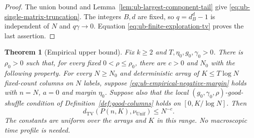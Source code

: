 \documentclass[11pt]{article}
\numberwithin{equation}{section}
\newtheorem{theorem}{Theorem}[section]
\newcommand{\TV}{\mathrm{TV}}
\newcommand{\Unif}{\mathrm{Unif}}
\newcommand{\1}{\mathbf 1}
\newcommand{\dTV}{d_{\TV}}
\newcommand{\nuUnif}{\nu_{\Unif}}
\begin{document}
\begin{proof}
The union bound and Lemma~\ref{lem:ub-largest-component-tail} give
\eqref{eq:ub-single-matrix-truncation}. The integers $B,d$ are fixed,
so $q=d_B^d-1$ is independent of $N$ and $q\gamma\to0$.
Equation \eqref{eq:ub-finite-exploration-tv} proves the last assertion.
\end{proof}

\begin{theorem}[Empirical upper bound]
\label{thm:ub-empirical-upper}
Fix $k\ge2$ and $T,\eta_0,g_0,\gamma_0>0$.
There is $\rho_0>0$ such that, for every fixed $0<\rho\le\rho_0$,
there are $c>0$ and $N_0$ with the following property.
For every $N\ge N_0$ and deterministic array of $K\le T\log N$
fixed-count columns on $N$ labels, suppose
\eqref{eq:ub-empirical-negative-margin} holds with $n=N$, $a=0$
and margin $\eta_0$. Suppose also that the local
$(g_0,\gamma_0,\rho)$-good-shuffle condition of
Definition~\ref{def:good-columns} holds on $[0,K/\log N]$.
Then
\begin{equation}
\label{eq:ub-empirical-tv-conclusion}
 \dTV(P(n,K),\nuUnif)\le N^{-c}.
\end{equation}
The constants are uniform over the arrays and $K$ in this range.
No macroscopic time profile is needed.
\end{theorem}
\end{document}
